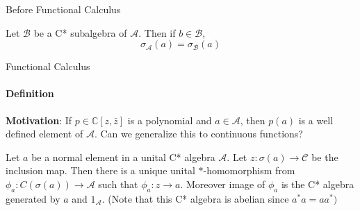 \documentclass[dvipsnames]{beamer}
\newcommand{\1}{\mathds{1}}	%
\begin{document}
%
%

\begin{frame}{Before Functional Calculus}
  \begin{lemma}
    Let $\mathcal{B}$ be a C* subalgebra of $\mathcal{A}$. Then if $b \in \mathcal{B}$, $$\sigma_{\mathcal{A}}(a) = \sigma_{\mathcal{B}}(a)$$ 
  \end{lemma}
\end{frame}

\begin{frame}{Functional Calculus}
  \framesubtitle{Definition}
  \textbf{Motivation}: If $p \in \mathbb{C}[z, \bar{z}]$ is a polynomial and $a \in \mathcal{A}$, then $p(a)$ is a well defined element of $\mathcal{A}$. Can we generalize this to continuous functions?
  \pause
  \begin{theorem}
    Let $a$ be a normal element in a unital C* algebra $\mathcal{A}$. Let $z: \sigma(a) \to \mathcal{C}$ be the inclusion map. Then there is a unique unital $*$-homomorphism from $\phi_a: C(\sigma(a)) \to \mathcal{A}$ such that $\phi_a: z \to a$. \pause Moreover image of $\phi_a$ is the C* algebra generated by $a$ and $1_\mathcal{A}$. (Note that this C* algebra is abelian since $a^*a = aa^*)$
  \end{theorem}
\end{frame}
\end{document}
